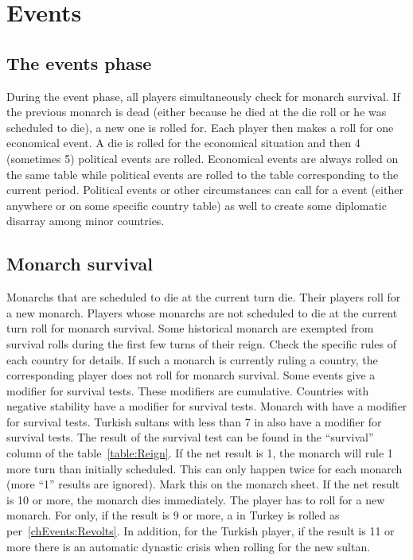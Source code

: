 
\chapter{Events}\label{chapter:Events}

\section{The events phase}\label{chEvents:Events:Events Phase}

\aparag[Overview.] During the event phase, all players simultaneously
check for monarch survival. If the previous monarch is dead (either
because he died at the die roll or he was scheduled to die), a new one
is rolled for. Each player then makes a roll for one economical event. A
die is rolled for the economical situation and then 4 (sometimes 5)
political events are rolled.
\bparag Economical events are always rolled on the same table while
political events are rolled to the table corresponding to the current
period.
\bparag Political events or other circumstances can call for a \REVOLT
event (either anywhere or on some specific country table) as well to
create some diplomatic disarray among minor countries.

\aparag[Sequence.]
\EventsDetails




\section{Monarch survival}\label{chEvents:Survival}

\aparag Monarchs that are scheduled to die at the current turn
die. Their players roll for a new monarch.
\aparag Players whose monarchs are not scheduled to die at the current
turn roll for monarch survival.
\bparag Some historical monarch are exempted from survival rolls during
the first few turns of their reign. Check the specific rules of each
country for details. If such a monarch is currently ruling a country,
the corresponding player does not roll for monarch survival.
\aparag Some events give a modifier for survival tests. These modifiers
are cumulative.
\bparag Countries with negative stability have a  modifier for
survival tests.
\bparag Monarch with  have a  modifier
for survival tests.
\bparag Turkish sultans with less than 7 in \MIL also have a 
modifier for survival tests.
\aparag The result of the survival test can be found in the ``survival''
column of the table~\ref{table:Reign}.
\bparag If the net result is 1, the monarch will rule 1 more turn than
initially scheduled. This can only happen twice for each monarch (more
``1'' results are ignored). Mark this on the monarch sheet.
\bparag If the net result is 10 or more, the monarch dies immediately.
The player has to roll for a new monarch.
\aparag \label{chEvents:Survival:TUR revolt}For \TUR only, if the result
is 9 or more, a \REVOLT in Turkey is rolled as
per~\ref{chEvents:Revolts}.
\bparag In addition, for the Turkish player, if the result is 11 or more
there is an automatic dynastic crisis when rolling for the new sultan.

